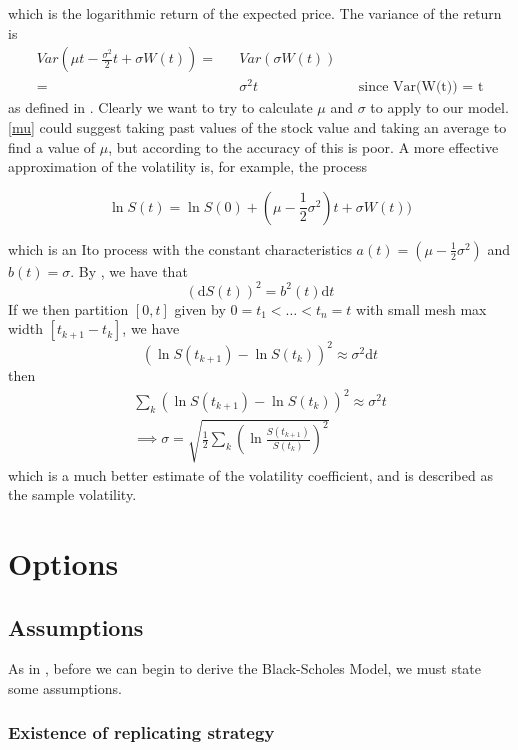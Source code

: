 \documentclass[11pt]{article} %
\begin{document}
which is the logarithmic return of the expected price.
The variance of the return is 
\begin{align}
    Var(\mu t - \frac{\sigma^2}{2}t + \sigma W(t)) = && Var(\sigma W(t)) \\
    = && \sigma^2t  && \text{since Var(W(t)) = t}
\end{align}
as defined in \cite{blackscholes}. Clearly we want to try to calculate $\mu$ and 
$\sigma$ to apply to our model. \ref{mu} could suggest taking past values of the 
stock value and taking an average to find a value of $\mu$, but according to 
\cite{blackscholes} the accuracy of this is poor. 
A more effective approximation of the volatility is, for example, the process 

\begin{equation}
    \ln{S(t)} = \ln{S(0)} + (\mu - \frac{1}{2}\sigma^2)t + \sigma W(t))
\end{equation}

which is an Ito process with the constant characteristics $a(t) = (\mu - \frac{1}{2}\sigma^2)$
 and $b(t) = \sigma$. By \cite{quadtraticvariation}, we have that
 \begin{equation}
     (\mathrm{d}S(t))^2 = b^2(t) \mathrm{d}t
 \end{equation}
 If we then partition $[0,t]$ given by $0 = t_1 < \dots < t_n = t$ with small mesh max 
 width $[t_{k+1} - t_k]$, we have 
 \begin{equation}
     (\ln{S(t_{k+1}) - \ln{S(t_k)}})^2 \approx \sigma^2 \mathrm{d}t
 \end{equation}
then 
\begin{align}
    \sum_k (\ln{S(t_{k+1}) - \ln{S(t_k)}})^2 \approx \sigma^2 t\\
    \implies
    \sigma = \sqrt{\frac{1}{2}\sum_k (\ln{\frac{S(t_{k+1})}{S(t_k)}})^2}
\end{align}
which is a much better estimate of the volatility coefficient, and is described as the 
sample volatility.
\section{Options}
\subsection{Assumptions}

As in \cite{blackscholes}, before we can begin to derive the Black-Scholes Model, we must 
state some assumptions.
\subsubsection{Existence of replicating strategy}\label{replicatingstrategy}
\end{document}
